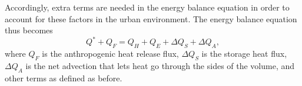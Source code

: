 	Accordingly, extra terms are needed in the energy balance equation in order to account for these factors in the urban environment.
	The energy balance equation thus becomes
	\begin{equation}
		Q^* + Q_F= Q_H + Q_E + \Delta Q_S + \Delta Q_A,
	\end{equation}
	where $Q_F$ is the anthropogenic heat release flux,
	$\Delta Q_S$ is the storage heat flux,
	$\Delta Q_A$ is the net advection that lets heat go through the sides of the volume, and
	other terms as defined as before.
%
%
%	
%	
%
%	
%
%
%
%
%	
